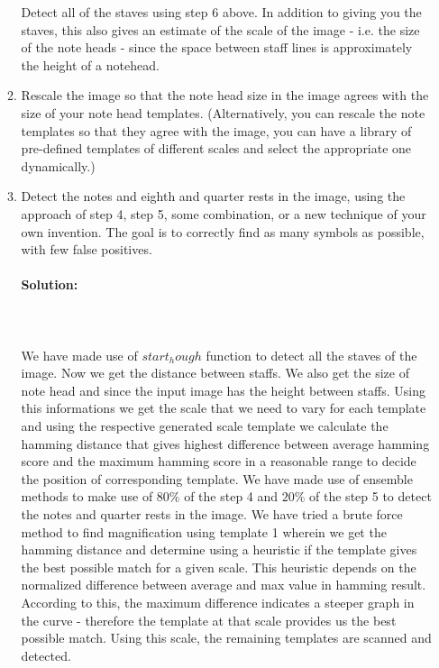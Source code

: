 \documentclass{article}
\begin{document}
\begin{enumerate}
\begin{enumerate}
			Detect all of the staves using step 6 above. In addition to giving you the staves, this also gives
			an estimate of the scale of the image - i.e. the size of the note heads - since the space between staff lines is approximately the height of a notehead.
			\item Rescale the image so that the note head size in the image agrees with the size of your note head
			templates. (Alternatively, you can rescale the note templates so that they agree with the image,
			you can have a library of pre-defined templates of different scales and select the appropriate one
			dynamically.)
			\item Detect the notes and eighth and quarter rests in the image, using the approach of step 4, step
			5, some combination, or a new technique of your own invention. The goal is to correctly find as many symbols as possible, with few false positives. \\ \\
			\textbf{Solution:} \\ \\ \\ \\
			We have made use of $start_hough$ function to detect all the staves of the image. Now we get the distance between staffs. We also get the size of note head and since the input image has the height between staffs. Using this informations we get the scale that we need to vary for each template and using the respective generated scale template we calculate the hamming distance that gives highest difference between average hamming score and the maximum hamming score in a reasonable range to decide the position of corresponding template. We have made use of ensemble methods to make use of ${80\%} $ of the step 4 and ${20\%}$ of the step 5 to detect the notes and quarter rests in the image. We have tried a brute force method to find magnification using template 1 wherein we get the hamming distance and determine using a heuristic if the template gives the best possible match for a given scale. This heuristic depends on the normalized difference between average and max value in hamming result. According to this, the maximum difference indicates a steeper graph in the curve - therefore the template at that scale provides us the best possible match. Using this scale, the remaining templates are scanned and detected.
		\end{enumerate}
	\end{enumerate}
\end{document}
